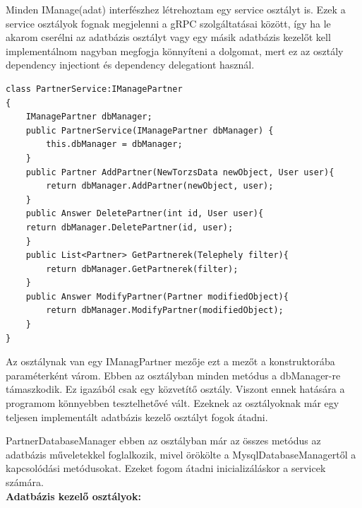 \documentclass[
]{thesis-ekf}
\theoremstyle{definition}
\theoremstyle{remark}
\begin{document}
Minden IManage(adat) interfészhez létrehoztam egy service osztályt is. Ezek a service osztályok fognak megjelenni a gRPC szolgáltatásai között, így ha le akarom cserélni az adatbázis osztályt vagy egy másik adatbázis kezelőt kell implementálnom nagyban megfogja könnyíteni a dolgomat, mert ez az osztály dependency injectiont és dependency delegationt használ. 
\begin{lstlisting}[caption={A partnerekkel foglalkozó osztály.},captionpos=b]
class PartnerService:IManagePartner
{
	IManagePartner dbManager;
	public PartnerService(IManagePartner dbManager)	{
		this.dbManager = dbManager;
	}
	public Partner AddPartner(NewTorzsData newObject, User user){
		return dbManager.AddPartner(newObject, user);
	}
	public Answer DeletePartner(int id, User user){
	return dbManager.DeletePartner(id, user);
	}
	public List<Partner> GetPartnerek(Telephely filter){
		return dbManager.GetPartnerek(filter);
	}
	public Answer ModifyPartner(Partner modifiedObject){
		return dbManager.ModifyPartner(modifiedObject);
	}
}

\end{lstlisting}
Az osztálynak van egy IManagPartner mezője ezt a mezőt a konstruktorába paraméterként várom. Ebben az osztályban minden metódus a dbManager-re támaszkodik. Ez igazából csak egy közvetítő osztály. Viszont ennek hatására a programom könnyebben tesztelhetővé vált. Ezeknek az osztályoknak már egy teljesen implementált adatbázis kezelő osztályt fogok átadni.

PartnerDatabaseManager ebben az osztályban már az összes metódus az adatbázis műveletekkel foglalkozik, mivel örökölte a MysqlDatabaseManagertől a kapcsolódási metódusokat. Ezeket fogom átadni inicializáláskor a servicek számára.\\
\textbf{Adatbázis kezelő osztályok:}
\end{document}
